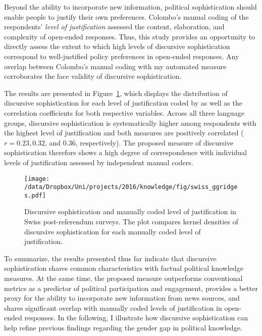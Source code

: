 Beyond the ability to incorporate new information, political sophistication should enable people to justify their own preferences. Colombo's \citeyearpar{colombo2016justifications} manual coding of the respondents' \textit{level of justification} assessed the content, elaboration, and complexity of open-ended responses. Thus, this study provides an opportunity to directly assess the extent to which high levels of discursive sophistication correspond to well-justified policy preferences in open-ended responses. Any overlap between Colombo's \citeyearpar{colombo2016justifications} manual coding with my automated measure corroborates the face validity of discursive sophistication.

The results are presented in Figure~\ref{fig:swiss_ggridges}, which displays the distribution of discursive sophistication for each level of justification coded by \citet{colombo2016justifications} as well as the correlation coefficients for both respective variables. Across all three language groups, discursive sophistication is systematically higher among respondents with the highest level of justification and both measures are positively correlated ($r=0.23, 0.32$, and $0.36$, respectively). The proposed measure of discursive sophistication therefore shows a high degree of correspondence with individual levels of justification assessed by independent manual coders.

\begin{figure}[h]\centering
\texttt{[image: /data/Dropbox/Uni/projects/2016/knowledge/fig/swiss\_ggridges.pdf]}
\caption[Discursive sophistication and manually coded level of justification in Swiss post-referendum surveys]{Discursive sophistication and manually coded level of justification \citep{colombo2016justifications} in Swiss post-referendum surveys. The plot compares kernel densities of discursive sophistication for each manually coded level of justification.}\label{fig:swiss_ggridges}
\end{figure}

To summarize, the results presented thus far indicate that discursive sophistication shares common characteristics with factual political knowledge measures. At the same time, the proposed measure outperforms conventional metrics as a predictor of political participation and engagement, provides a better proxy for the ability to incorporate new information from news sources, and shares significant overlap with manually coded levels of justification in open-ended responses. In the following, I illustrate how discursive sophistication can help refine previous findings regarding the gender gap in political knowledge.

